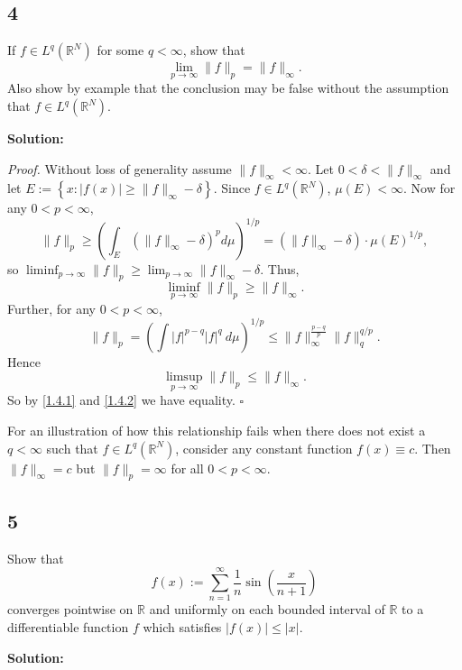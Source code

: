 \documentclass[12pt]{article}
\newcounter{ProofCounter}
\newenvironment{Proof}{\stepcounter{ProofCounter}\textit{Proof.}}{\hfill$\square$}
\begin{document}
\newpage
\subsection*{4}
If $f \in L^{q}(\mathbb{R}^{N})$ for some $q < \infty$, show that 
\[ \lim_{p\rightarrow\infty} \|f\|_{p} = \|f\|_{\infty}. \]
Also show by example that the conclusion may be false without the assumption that $f \in L^{q}(\mathbb{R}^{N})$.

{\bf Solution:}

\begin{Proof}
Without loss of generality assume $\|f\|_{\infty} < \infty$. Let $0 < \delta < \|f\|_{\infty}$ and let $E := \left\{ x : |f(x)| \geq \|f\|_{\infty} - \delta \right\}$. 
Since $f \in L^{q}(\mathbb{R}^{N})$, $\mu(E) < \infty$. Now for any $0 < p < \infty$,
\[ \|f\|_{p} \geq \left( \int_{E}(\|f\|_{\infty} - \delta)^{p} d\mu\right)^{1/p} = (\|f\|_{\infty} - \delta)\cdot \mu(E)^{1/p}, \]
so $\liminf_{p \rightarrow \infty}\|f\|_{p} \geq \lim_{p\rightarrow\infty}\|f\|_{\infty} - \delta$. Thus,
\begin{equation}
\liminf_{p \rightarrow \infty} \|f\|_{p} \geq \|f\|_{\infty}.
\label{1.4.1}
\end{equation}
Further, for any $0 < p < \infty$,
\[ \|f\|_{p} = \left( \int |f|^{p-q}|f|^{q}\ d\mu \right)^{1/p} \leq \|f\|_{\infty}^{\frac{p-q}{p}}\|f\|_{q}^{q/p}. \]
Hence 
\begin{equation}
\limsup_{p\rightarrow\infty}\|f\|_{p} \leq \|f\|_{\infty}.
\label{1.4.2}
\end{equation}
So by \eqref{1.4.1} and \eqref{1.4.2} we have equality.
\end{Proof}

For an illustration of how this relationship fails when there does not exist a $q < \infty$ such that $f \in L^{q}(\mathbb{R}^{N})$, consider any
constant function $f(x) \equiv c$. Then $\|f\|_{\infty} = c$ but $\|f\|_{p} = \infty$ for all $0 < p < \infty$.

\newpage
\subsection*{5}
Show that 
\[ f(x) := \sum_{n=1}^{\infty}\frac{1}{n}\sin\left( \frac{x}{n+1} \right) \]
converges pointwise on $\mathbb{R}$ and uniformly on each bounded interval of $\mathbb{R}$ to a differentiable function $f$ which satisfies 
$|f(x)| \leq |x|$.

{\bf Solution:}
\end{document}
